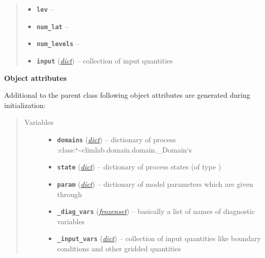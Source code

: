 \documentclass[letterpaper,10pt,english]{sphinxmanual}
\begin{document}
\begin{fulllineitems}
\begin{quote}
\begin{description}
\begin{itemize}
\item {} 
\textbf{\texttt{lev}} -- 

\item {} 
\textbf{\texttt{num\_lat}} -- 

\item {} 
\textbf{\texttt{num\_levels}} -- 

\item {} 
\textbf{\texttt{input}} (\href{http://docs.python.org/2.7/library/stdtypes.html\#dict}{\emph{dict}}) -- collection of input quantities

\end{itemize}

\end{description}\end{quote}

\textbf{Object attributes}

Additional to the parent class {\hyperref[api/climlab.process:climlab.process.process.Process]{\emph{}}}
following object attributes are generated during initialization:
\begin{quote}\begin{description}
\item[{Variables}] \leavevmode\begin{itemize}
\item {} 
\textbf{\texttt{domains}} (\href{http://docs.python.org/2.7/library/stdtypes.html\#dict}{\emph{dict}}) -- dictionary of process :class:{\color{red}\bfseries{}{}`}\textasciitilde{}climlab.domain.domain.\_Domain{}`s

\item {} 
\textbf{\texttt{state}} (\href{http://docs.python.org/2.7/library/stdtypes.html\#dict}{\emph{dict}}) -- dictionary of process states 
(of type {\hyperref[api/climlab.domain:climlab.domain.field.Field]{\emph{}}})

\item {} 
\textbf{\texttt{param}} (\href{http://docs.python.org/2.7/library/stdtypes.html\#dict}{\emph{dict}}) -- dictionary of model parameters which are given
through 

\item {} 
\textbf{\texttt{\_diag\_vars}} (\href{http://docs.python.org/2.7/library/stdtypes.html\#frozenset}{\emph{frozenset}}) -- basically a list of names of diagnostic variables

\item {} 
\textbf{\texttt{\_input\_vars}} (\href{http://docs.python.org/2.7/library/stdtypes.html\#dict}{\emph{dict}}) -- collection of input quantities like boundary conditions
and other gridded quantities


\end{itemize}
\end{description}
\end{quote}
\end{fulllineitems}
\end{document}
